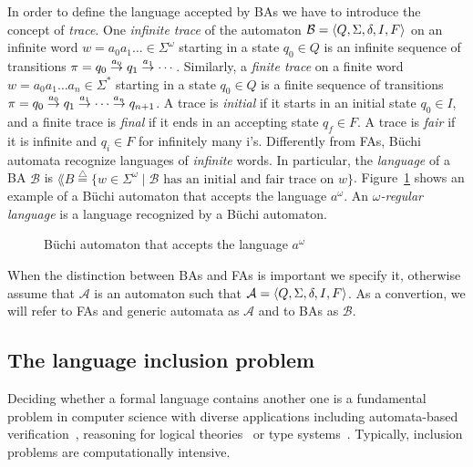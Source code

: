 In order to define the language accepted by BAs we have to introduce the concept
of \emph{trace}.
One \emph{infinite trace} of the automaton $\mathcal{B}=\langle Q, \Sigma, \delta, I, F\rangle$ on an infinite
word $w= a_0 a_1 \dots \in \Sigma ^{\omega}$ starting in a state $q_0 \in Q$
is an infinite sequence of transitions $\pi = q_0 \overset{a_0}{\rightarrow} q_1 \overset{a_1}{\rightarrow} \cdots$.
Similarly, a \emph{finite trace} on a finite word $w = a_0 a_1 \dots a_n \in \Sigma^*$
starting in a state $q_0 \in Q$ is a finite sequence of transitions
$\pi = q_0 \overset{a_0}{\rightarrow} q_1 \overset{a_1}{\rightarrow} \cdots \overset{a_n}{\rightarrow} q_{n+1}$.
A trace is \emph{initial} if it starts in an initial state $q_0 \in I$, and a finite trace is \emph{final}
if it ends in an accepting state $q_f \in F$.
A trace is \emph{fair} if it is infinite and $q_i \in F$ for infinitely many i's.
Differently from FAs, B{\"u}chi automata recognize languages of \emph{infinite} words.
In particular, the \emph{language} of a BA $\mathcal{B}$ is
$\lang{B} \overset{\triangle}{=} \{ w \in \Sigma ^{\omega} \; | \;
\mathcal{B} \textrm{ has an initial and fair trace on $w$}\}$.
Figure~\ref{fig:BA-example} shows an example of a B{\"u}chi automaton that
accepts the language $a^{\omega}$.
An \emph{$\omega$-regular language} is a language recognized by a B{\"u}chi
automaton.

\begin{figure}[h]
\centering
{}
\caption{B{\"u}chi automaton that accepts the language $a^{\omega}$}
\label{fig:BA-example}
\end{figure}

When the distinction between BAs and FAs is important we specify it,
otherwise assume that $\mathcal{A}$ is an automaton such that $\mathcal{A}=\langle Q, \Sigma, \delta, I, F\rangle$.
As a convertion, we will refer to FAs and generic automata as $\mathcal{A}$
and to BAs as $\mathcal{B}$.



\subsection{The language inclusion problem}

Deciding whether a formal language contains another one is a fundamental problem
in computer science with diverse applications including automata-based
verification~\cite{kupferman2018automata},
reasoning for logical theories~\cite{esparza2017automata}
or type systems~\cite{hofmann2014abstract}.
Typically, inclusion problems are computationally intensive.

